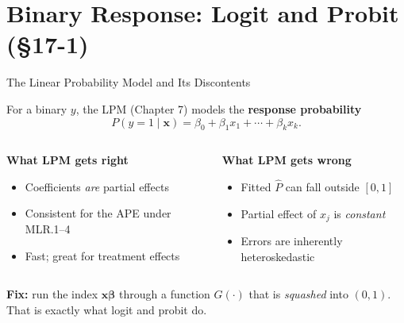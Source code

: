 \documentclass[aspectratio=169, 12pt]{beamer}
\newcommand{\xbeta}{\mathbf{x}\boldsymbol{\beta}}   %
\begin{document}
\section{Binary Response: Logit and Probit (\S17-1)}

\begin{frame}[shrink=12]{The Linear Probability Model and Its Discontents}

  For a binary $y$, the LPM (Chapter 7) models the \textbf{response probability}
  \[
    P(y=1 \mid \mathbf{x}) = \beta_0 + \beta_1 x_1 + \cdots + \beta_k x_k .
  \]

  \begin{columns}[t]
    \begin{highlightbox}
      \textbf{\textcolor{positive}{What LPM gets right}}
      \begin{itemize}
        \item Coefficients \emph{are} partial effects
        \item Consistent for the APE under MLR.1--4
        \item Fast; great for treatment effects
      \end{itemize}
    \end{highlightbox}

    \begin{highlightbox}
      \textbf{\textcolor{negative}{What LPM gets wrong}}
      \begin{itemize}
        \item Fitted $\widehat{P}$ can fall outside $[0,1]$
        \item Partial effect of $x_j$ is \emph{constant}
        \item Errors are inherently heteroskedastic
      \end{itemize}
    \end{highlightbox}
  \end{columns}

  \smallskip

  \begin{keybox}
    \textbf{Fix:} run the index $\xbeta$ through a function $G(\cdot)$ that is
    \emph{squashed} into $(0,1)$. That is exactly what logit and probit do.
  \end{keybox}

\end{frame}
\end{document}
